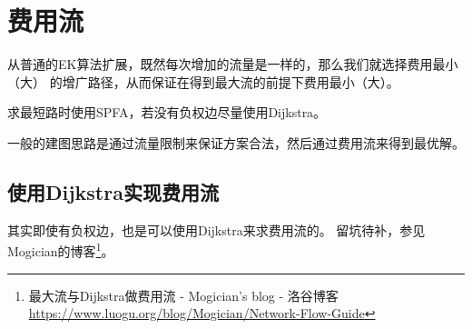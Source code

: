 \section{费用流}
从普通的EK算法扩展，既然每次增加的流量是一样的，那么我们就选择费用最小（大）
的增广路径，从而保证在得到最大流的前提下费用最小（大）。

求最短路时使用SPFA，若没有负权边尽量使用Dijkstra。

一般的建图思路是通过流量限制来保证方案合法，然后通过费用流来得到最优解。

\subsection{使用Dijkstra实现费用流}
其实即使有负权边，也是可以使用Dijkstra来求费用流的。
留坑待补，参见Mogician的博客\footnote{
    最大流与Dijkstra做费用流 - Mogician's blog - 洛谷博客
    \url{https://www.luogu.org/blog/Mogician/Network-Flow-Guide}}。
